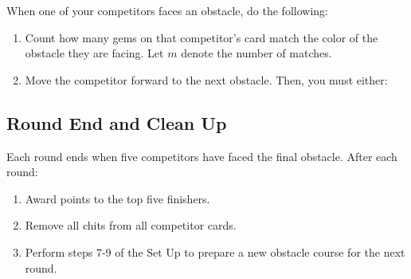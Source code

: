 \documentclass[a6paper, 11pt, parskip=half, DIV=15]{scrartcl}
\begin{document}
When one of your competitors faces an obstacle, do the following:
\begin{enumerate}[leftmargin=*]
\item Count how many gems on that competitor's card match the color of the obstacle they are facing. Let $m$ denote the number of matches.
\item Move the competitor forward to the next obstacle. Then, you must either:
\end{enumerate}

\medskip


\newpage
\subsection*{Round End and Clean Up}
Each round ends when five competitors have faced the final obstacle. After each round:
\begin{enumerate}[leftmargin=*]
\item Award points to the top five finishers.
\item Remove all chits from all competitor cards.
\item Perform steps 7-9 of the Set Up to prepare a new obstacle course for the next round.
\end{enumerate}

\smallskip

 
\end{document}
